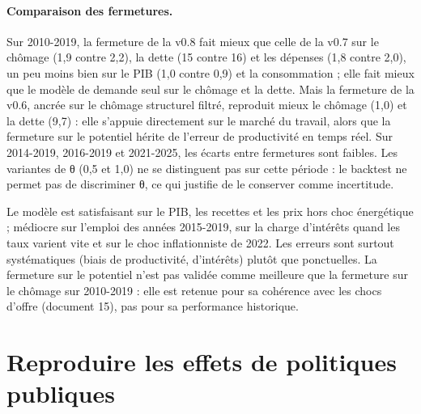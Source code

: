 \paragraph{Comparaison des fermetures.} Sur 2010-2019, la fermeture de la v0.8 fait mieux que celle de la v0.7 sur le
chômage (1,9 contre 2,2), la dette (15 contre 16) et les dépenses (1,8 contre 2,0), un peu moins bien sur le PIB
(1,0 contre 0,9) et la consommation ; elle fait mieux que le modèle de demande seul sur le chômage et la dette. Mais la fermeture de la v0.6, ancrée sur le chômage structurel
filtré, reproduit mieux le chômage (1,0) et la dette (9,7) : elle s'appuie directement sur le marché du travail,
alors que la fermeture sur le potentiel hérite de l'erreur de productivité en temps réel. Sur 2014-2019, 2016-2019 et
2021-2025, les écarts entre fermetures sont faibles. Les variantes de θ (0,5 et 1,0) ne se distinguent pas sur cette
période : le backtest ne permet pas de discriminer θ, ce qui justifie de le conserver comme incertitude.

\begin{resultat}
Le modèle est satisfaisant sur le PIB, les recettes et les prix hors choc énergétique ; médiocre sur l'emploi des
années 2015-2019, sur la charge d'intérêts quand les taux varient vite et sur le choc inflationniste de 2022. Les
erreurs sont surtout systématiques (biais de productivité, d'intérêts) plutôt que ponctuelles. La fermeture sur le
potentiel n'est pas validée comme meilleure que la fermeture sur le chômage sur 2010-2019 : elle est retenue pour sa
cohérence avec les chocs d'offre (document 15), pas pour sa performance historique.
\end{resultat}

\section{Reproduire les effets de politiques publiques}

\begin{table}[htbp]\centering\scriptsize
\caption{Effets simulés et évaluations empiriques (simulations v0.8, comportements centraux).}\label{tab:politiques}
\end{table}

